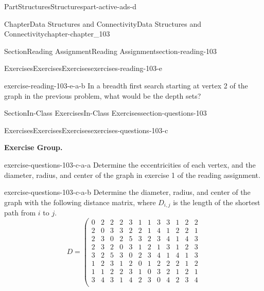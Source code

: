 \documentclass[oneside,10pt,]{book}
\numberwithin{equation}{section}
\begin{document}
\begin{partptx}{Part}{Structures}{}{Structures}{}{}{part-active-ads-d}
\begin{chapterptx}{Chapter}{Data Structures and Connectivity}{}{Data Structures and Connectivity}{}{}{chapter-chapter_103}
\begin{sectionptx}{Section}{Reading Assignment}{}{Reading Assignment}{}{}{section-reading-103}
\begin{exercises-subsection-numberless}{Exercises}{Exercises}{}{Exercises}{}{}{exercises-reading-103-e}
\begin{exercisegroup}
\begin{divisionexerciseeg}{2}{}{}{exercise-reading-103-e-a-b}
In a breadth first search starting at vertex 2 of the graph in the previous problem, what would be the depth sets?%
\end{divisionexerciseeg}%
\end{exercisegroup}
\par\medskip\noindent
\end{exercises-subsection-numberless}
\end{sectionptx}
%
%
\typeout{************************************************}
\typeout{************************************************}
%
\begin{sectionptx}{Section}{In-Class Exercises}{}{In-Class Exercises}{}{}{section-questions-103}
%
%
%
\typeout{************************************************}
\typeout{************************************************}
%
\begin{exercises-subsection-numberless}{Exercises}{Exercises}{}{Exercises}{}{}{exercises-questions-103-c}
\par\medskip\noindent%
\textbf{Exercise Group.}\space\space%
\begin{exercisegroup}
\begin{divisionexerciseeg}{1}{}{}{exercise-questions-103-c-a-a}%
Determine the eccentricities of each vertex, and the diameter, radius, and center of the graph in exercise 1 of the reading assignment.%
\end{divisionexerciseeg}%
\begin{divisionexerciseeg}{2}{}{}{exercise-questions-103-c-a-b}%
Determine the diameter, radius, and center of the graph with the following distance matrix, where \(D_{i,j}\) is the length of the shortest path from \(i\) to \(j\).%
\begin{equation*}
D=\left(
\begin{array}{cccccccccccc}
0 & 2 & 2 & 2 & 3 & 1 & 1 & 3 & 3 & 1 & 2 & 2 \\
2 & 0 & 3 & 3 & 2 & 2 & 1 & 4 & 1 & 2 & 2 & 1 \\
2 & 3 & 0 & 2 & 5 & 3 & 2 & 3 & 4 & 1 & 4 & 3 \\
2 & 3 & 2 & 0 & 3 & 1 & 2 & 1 & 3 & 1 & 2 & 3 \\
3 & 2 & 5 & 3 & 0 & 2 & 3 & 4 & 1 & 4 & 1 & 3 \\
1 & 2 & 3 & 1 & 2 & 0 & 1 & 2 & 2 & 2 & 1 & 2 \\
1 & 1 & 2 & 2 & 3 & 1 & 0 & 3 & 2 & 1 & 2 & 1 \\
3 & 4 & 3 & 1 & 4 & 2 & 3 & 0 & 4 & 2 & 3 & 4 \\

\end{array}
\end{equation*}
\end{divisionexerciseeg}
\end{exercisegroup}
\end{exercises-subsection-numberless}
\end{sectionptx}
\end{chapterptx}
\end{partptx}
\end{document}
